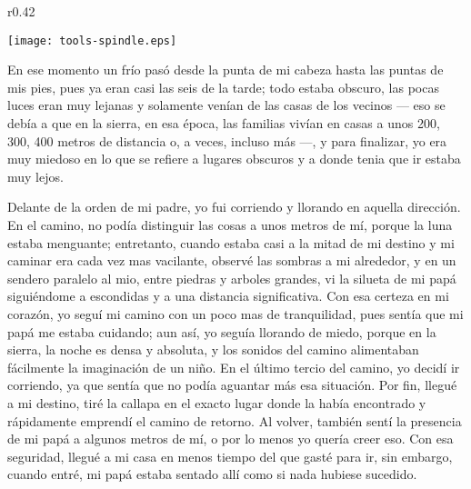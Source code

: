 \ifdefined\EnableIncludeImages
\begin{wrapfigure}{r}{0.42\textwidth}
  \begin{center}
  \vspace{-10pt}
    \texttt{[image: tools-spindle.eps]}
  \end{center}
  \vspace{-20pt}
\end{wrapfigure}
\fi
En ese momento un frío pasó desde la punta de mi cabeza hasta las puntas de mis pies, pues ya eran casi las seis de la tarde; todo estaba obscuro, las pocas luces eran muy lejanas y solamente venían de las casas de los vecinos --- eso se debía a que en la sierra, en esa época, las familias vivían en casas a unos 200, 300, 400 metros de distancia o, a veces, incluso más ---, y para finalizar, yo era muy miedoso en lo que se refiere a lugares obscuros y a donde tenia que ir estaba muy lejos.

Delante de la orden de mi padre, yo fui corriendo y llorando en aquella dirección. En el camino, no podía distinguir las cosas a unos metros de mí, porque la luna estaba menguante; entretanto, cuando estaba casi a la mitad de mi destino y mi caminar era cada vez mas vacilante, observé las sombras a mi alrededor, y en un sendero paralelo al mio, entre piedras y arboles grandes, vi la silueta de mi papá siguiéndome a escondidas y a una distancia significativa.
Con esa certeza en mi corazón, yo seguí mi camino con un poco mas de tranquilidad, pues sentía que mi papá me estaba cuidando; aun así, yo seguía llorando de miedo, porque en la sierra, la noche es densa y absoluta, y los sonidos del camino alimentaban fácilmente la imaginación de un niño.
En el último tercio del camino, yo decidí ir corriendo, ya que sentía que no podía aguantar más esa situación. Por fin, llegué a mi destino, tiré la callapa en el exacto lugar donde la había encontrado y rápidamente emprendí el camino de retorno.
Al volver, también sentí la presencia de mi papá a algunos metros de mí, o por lo menos yo quería creer eso. Con esa seguridad, llegué a mi casa en menos tiempo del que gasté para ir, sin embargo, cuando entré, mi papá estaba sentado allí como si nada hubiese sucedido.


